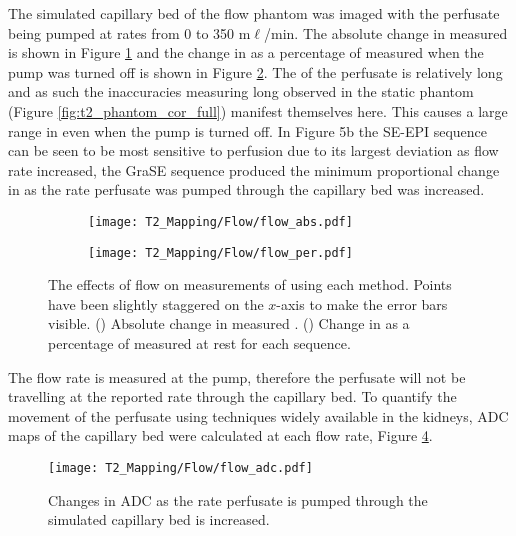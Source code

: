 The simulated capillary bed of the flow phantom was imaged with the perfusate being pumped at rates from 0 to 350 m$\ell$/min. The absolute change in measured \ttwo is shown in Figure \ref{fig:t2_flow_abs} and the change in \ttwo as a percentage of \ttwo measured when the pump was turned off is shown in Figure \ref{fig:t2_flow_percent}. The \ttwo of the perfusate is relatively long and as such the inaccuracies measuring long \ttwo observed in the static phantom (Figure \ref{fig:t2_phantom_cor_full}) manifest themselves here. This causes a large range in \ttwo even when the pump is turned off. In Figure 5b the \ac{SE}-\ac{EPI} sequence can be seen to be most sensitive to perfusion due to its largest deviation as flow rate increased, the \ac{GraSE} sequence produced the minimum proportional change in \ttwo as the rate perfusate was pumped through the capillary bed was increased.
\begin{figure}[H]
	\centering
	\begin{subfigure}[c]{0.47\textwidth}
		\centering
		\texttt{[image: T2\_Mapping/Flow/flow\_abs.pdf]}
		\caption{}
		\label{fig:t2_flow_abs}
	\end{subfigure}
	\hfill
	\begin{subfigure}[c]{0.47\textwidth}
		\centering
		\texttt{[image: T2\_Mapping/Flow/flow\_per.pdf]}
		\caption{}
		\label{fig:t2_flow_percent}
	\end{subfigure}
	\caption{The effects of flow on measurements of \ttwo using each method. Points have been slightly staggered on the $x$-axis to make the error bars visible. () Absolute change in measured \ttwo. () Change in \ttwo as a percentage of \ttwo measured at rest for each sequence.}
	\label{fig:t2_flow}
\end{figure}

The flow rate is measured at the pump, therefore the perfusate will not be travelling at the reported rate through the capillary bed. To quantify the movement of the perfusate using techniques widely available in the kidneys, \ac{ADC} maps of the capillary bed were calculated at each flow rate, Figure \ref{fig:t2_flow_adc}.

\begin{figure}[H]
	\centering
	\texttt{[image: T2\_Mapping/Flow/flow\_adc.pdf]}
	\caption{Changes in ADC as the rate perfusate is pumped through the simulated capillary bed is increased.}
	\label{fig:t2_flow_adc}	
\end{figure} 

